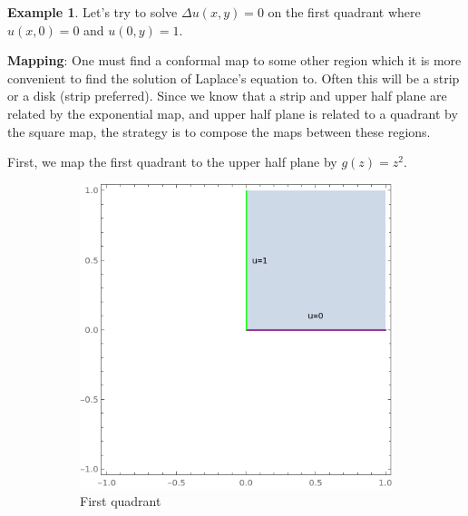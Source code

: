 \documentclass[a4paper, 12pt]{article}
\theoremstyle{definition}
\newtheorem{example}{Example}
\numberwithin{theorem}{section}
\numberwithin{definition}{section}
\numberwithin{exercise}{section}
\numberwithin{remark}{section}
\numberwithin{figure}{section}
\numberwithin{example}{section}
\begin{document}
\begin{example}
    Let's try to solve $\Delta u(x,y) = 0$ on the first quadrant where $u(x,0) = 0$ and $u(0,y) = 1$.

    \textbf{Mapping}:
    One must find a conformal map to some other region which it is more convenient to find the solution of Laplace's equation to.
    Often this will be a strip or a disk (strip preferred).
    Since we know that a strip and upper half plane are related by the exponential map,
    and upper half plane is related to a quadrant by the square map,
    the strategy is to compose the maps between these regions.

    First, we map the first quadrant to the upper half plane by $g(z) = z^2$.
    \begin{figure}[tbp]
        \centering
        \begin{subfigure}[b]{0.4\textwidth}
            \centering
            \includegraphics[width=\textwidth]{LaplaceEquation3}
            \caption{First quadrant}
        \end{subfigure}
        \begin{subfigure}[b]{0.4\textwidth}
            \centering

\end{subfigure}
\end{figure}
\end{example}
\end{document}
